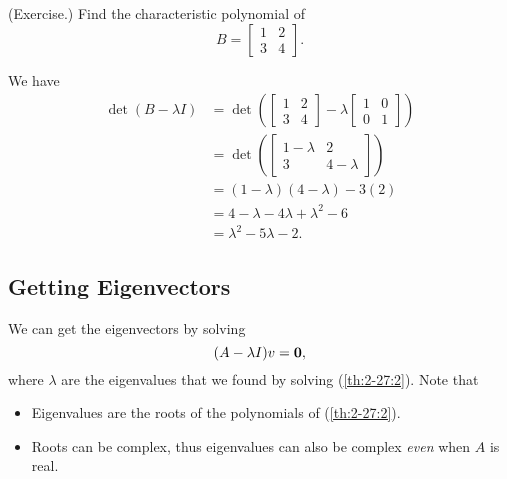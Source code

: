 \documentclass[letterpaper]{article}
\newcommand{\0}{\mathbf{0}}
\begin{document}
\begin{mdframed}
    (Exercise.) Find the characteristic polynomial of \[B = \begin{bmatrix}
        1 & 2 \\ 3 & 4
    \end{bmatrix}.\]

    \begin{mdframed}
        We have 
        \begin{equation*}
            \begin{aligned}
                \det(B - \lambda I) &= \det\left(\begin{bmatrix}
                    1 & 2 \\ 3 & 4
                \end{bmatrix} - \lambda \begin{bmatrix}
                    1 & 0 \\ 0 & 1
                \end{bmatrix}\right) \\ 
                    &= \det\left(\begin{bmatrix}
                        1 - \lambda & 2 \\ 
                        3 & 4 - \lambda
                    \end{bmatrix}\right) \\ 
                    &= (1 - \lambda)(4 - \lambda) - 3(2) \\ 
                    &= 4 - \lambda - 4\lambda + \lambda^2 - 6 \\ 
                    &= \lambda^2 - 5\lambda - 2.
            \end{aligned}
        \end{equation*}
    \end{mdframed}
\end{mdframed}

\subsection{Getting Eigenvectors}
We can get the eigenvectors by solving \begin{equation}{\label{eq:2-27:3}}
    (A - \lambda I)v = \0,
\end{equation}
where $\lambda$ are the eigenvalues that we found by solving (\ref{th:2-27:2}). Note that 
\begin{itemize}
    \item Eigenvalues are the roots of the polynomials of (\ref{th:2-27:2}).
    \item Roots can be complex, thus eigenvalues can also be complex \emph{even} when $A$ is real. 
\end{itemize}
\end{document}
